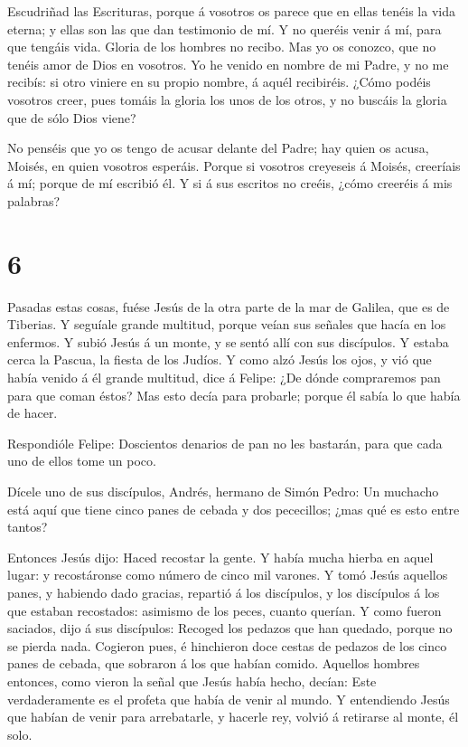  Escudriñad las Escrituras, porque á vosotros os parece que
en ellas tenéis la vida eterna; y ellas son las que dan testimonio de
mí.  Y no queréis venir á mí, para que tengáis vida.
 Gloria de los hombres no recibo.  Mas yo os
conozco, que no tenéis amor de Dios en vosotros.  Yo he
venido en nombre de mi Padre, y no me recibís: si otro viniere en su
propio nombre, á aquél recibiréis.  ¿Cómo podéis vosotros
creer, pues tomáis la gloria los unos de los otros, y no buscáis la
gloria que de sólo Dios viene?

 No penséis que yo os tengo de acusar delante del Padre;
hay quien os acusa, Moisés, en quien vosotros esperáis. 
Porque si vosotros creyeseis á Moisés, creeríais á mí; porque de mí
escribió él.  Y si á sus escritos no creéis, ¿cómo creeréis
á mis palabras?

\hypertarget{section-5}{%
\section{6}\label{section-5}}

 Pasadas estas cosas, fuése Jesús de la otra parte de la mar
de Galilea, que es de Tiberias.  Y seguíale grande multitud,
porque veían sus señales que hacía en los enfermos.  Y subió
Jesús á un monte, y se sentó allí con sus discípulos.  Y
estaba cerca la Pascua, la fiesta de los Judíos.  Y como
alzó Jesús los ojos, y vió que había venido á él grande multitud, dice á
Felipe: ¿De dónde compraremos pan para que coman éstos?  Mas
esto decía para probarle; porque él sabía lo que había de hacer.

 Respondióle Felipe: Doscientos denarios de pan no les
bastarán, para que cada uno de ellos tome un poco.

 Dícele uno de sus discípulos, Andrés, hermano de Simón
Pedro:  Un muchacho está aquí que tiene cinco panes de
cebada y dos pececillos; ¿mas qué es esto entre tantos?

 Entonces Jesús dijo: Haced recostar la gente. Y había
mucha hierba en aquel lugar: y recostáronse como número de cinco mil
varones.  Y tomó Jesús aquellos panes, y habiendo dado
gracias, repartió á los discípulos, y los discípulos á los que estaban
recostados: asimismo de los peces, cuanto querían.  Y como
fueron saciados, dijo á sus discípulos: Recoged los pedazos que han
quedado, porque no se pierda nada.  Cogieron pues, é
hinchieron doce cestas de pedazos de los cinco panes de cebada, que
sobraron á los que habían comido.  Aquellos hombres
entonces, como vieron la señal que Jesús había hecho, decían: Este
verdaderamente es el profeta que había de venir al mundo. 
Y entendiendo Jesús que habían de venir para arrebatarle, y hacerle rey,
volvió á retirarse al monte, él solo.

